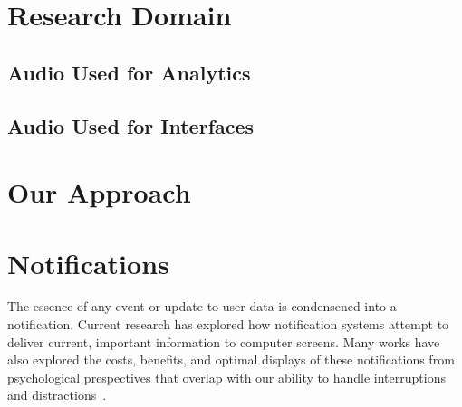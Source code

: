 \section{                  Research Domain                                    }
\subsection{                  Audio Used for Analytics                        }
\subsection{                  Audio Used for Interfaces                       }


\section{                  Our Approach                                       }





\section{                  Notifications                                      }

The essence of any event or update to user data is condensened into a
notification.  Current research has explored how notification systems attempt to
deliver current, important information to computer screens.  Many works have
also explored the costs, benefits, and optimal displays of these notifications
from psychological prespectives that overlap with our ability to handle
interruptions and distractions~\cite{McCrickard2003509,
cutrell2001notification}.
